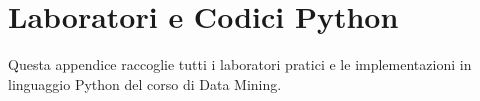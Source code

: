 \chapter{Laboratori e Codici Python}
\label{app:dm-python-labs}

Questa appendice raccoglie tutti i laboratori pratici e le implementazioni in linguaggio Python del corso di Data Mining.










